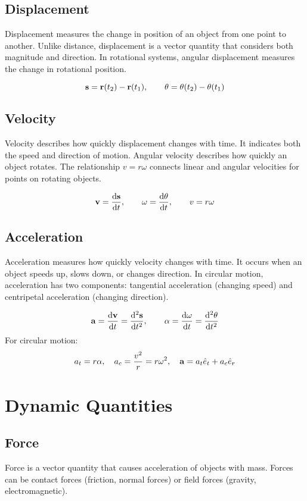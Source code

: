 \documentclass[11pt,a4paper]{article}
\begin{document}
\subsection*{Displacement}
Displacement measures the change in position of an object from one point to another. Unlike distance, displacement is a vector quantity that considers both magnitude and direction. In rotational systems, angular displacement measures the change in rotational position.

\[
\vb{s} = \vb{r}(t_2) - \vb{r}(t_1), \qquad 
\theta = \theta(t_2) - \theta(t_1)
\]

\subsection*{Velocity}
Velocity describes how quickly displacement changes with time. It indicates both the speed and direction of motion. Angular velocity describes how quickly an object rotates. The relationship $v = r\omega$ connects linear and angular velocities for points on rotating objects.

\[
\vb{v} = \dv{\vb{s}}{t}, \qquad \omega = \dv{\theta}{t}, \qquad v = r\omega
\]

\subsection*{Acceleration}
Acceleration measures how quickly velocity changes with time. It occurs when an object speeds up, slows down, or changes direction. In circular motion, acceleration has two components: tangential acceleration (changing speed) and centripetal acceleration (changing direction).

\[
\vb{a} = \dv{\vb{v}}{t} = \dv[2]{\vb{s}}{t}, \qquad
\alpha = \dv{\omega}{t} = \dv[2]{\theta}{t}
\]
For circular motion:
\[
a_t = r\alpha, \quad a_c = \frac{v^2}{r} = r\omega^2, \quad
\vb{a} = a_t \hat e_t + a_c \hat e_r
\]

\section{Dynamic Quantities}

\subsection*{Force}
Force is a vector quantity that causes acceleration of objects with mass. Forces can be contact forces (friction, normal forces) or field forces (gravity, electromagnetic). 
\end{document}
